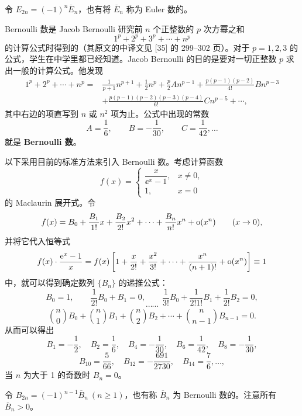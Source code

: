 \begin{xremark}
令 $E_{2n}=(-1)^n\overline E_n$，也有将 $\overline E_n$ 称为 Euler 数的。
\end{xremark}

Bernoulli 数是 Jacob Bernoulli 研究前 $n$ 个正整数的 $p$ 次方幂之和
\[
  1^p+2^p+3^p+\cdots+n^p
\]
的计算公式时得到的（其原文的中译文见 [35] 的 299--302 页）。对于 $p=1,2,3$ 的公式，学生在中学里都已经知道。Jacob Bernoulli 的目的是要对一切正整数 $p$ 求出一般的计算公式。他发现
\[
  \begin{aligned}
  1^p+2^p+\cdots+n^p
  ={}&\frac{1}{p+1}n^{p+1}+\frac12n^p+\frac{p}{2}An^{p-1}
  +\frac{p(p-1)(p-2)}{4!}Bn^{p-3}\\
  &+\frac{p(p-1)(p-2)(p-3)(p-4)}{6!}Cn^{p-5}+\cdots,
  \end{aligned}
\]
其中右边的项直写到 $n$ 或 $n^2$ 项为止。公式中出现的常数
\[
  A=\frac16,\qquad B=-\frac{1}{30},\qquad C=\frac{1}{42},\ldots
\]
就是 \textbf{Bernoulli 数}。

以下采用目前的标准方法来引入 Bernoulli 数。考虑计算函数
\[
  f(x)=
  \begin{cases}
    \dfrac{x}{\ee^x-1},&x\neq0,\\
    1,&x=0
  \end{cases}
\]
的 Maclaurin 展开式。令
\[
  f(x)=B_0+\frac{B_1}{1!}x+\frac{B_2}{2!}x^2+\cdots+\frac{B_n}{n!}x^n+\mathrm{o}(x^n)\qquad(x\to0),
\]
并将它代入恒等式
\[
  f(x)\cdot\frac{\mathrm{e}^x-1}{x}
  =f(x)\left[1+\frac{x}{2!}+\frac{x^2}{3!}+\cdots+\frac{x^n}{(n+1)!}+\mathrm{o}(x^n)\right]\equiv1
\]
中，就可以得到确定数列 $\{B_n\}$ 的递推公式：
\[
  B_0=1,\qquad \frac{1}{2!}B_0+B_1=0,\qquad
  \frac{1}{3!}B_0+\frac{1}{2!1!}B_1+\frac{1}{2!}B_2=0,
\]
\[
  \cdots\cdots
\]
\[
  \binom n0B_0+\binom n1B_1+\binom n2B_2+\cdots+\binom n{n-1}B_{n-1}=0.
\]
从而可以得出
\[
  B_1=-\frac12,\quad B_2=\frac16,\quad B_4=-\frac{1}{30},\quad B_6=\frac{1}{42},\quad B_8=-\frac{1}{30},
\]
\[
  B_{10}=\frac{5}{66},\quad B_{12}=-\frac{691}{2730},\quad B_{14}=\frac76,\ldots,
\]
当 $n$ 为大于 1 的奇数时 $B_n=0$。

\begin{xremark}
令 $B_{2n}=(-1)^{n-1}\overline B_n\ (n\geqslant1)$，也有称 $\overline B_n$ 为 Bernoulli 数的。注意所有 $\overline B_n>0$。
\end{xremark}

